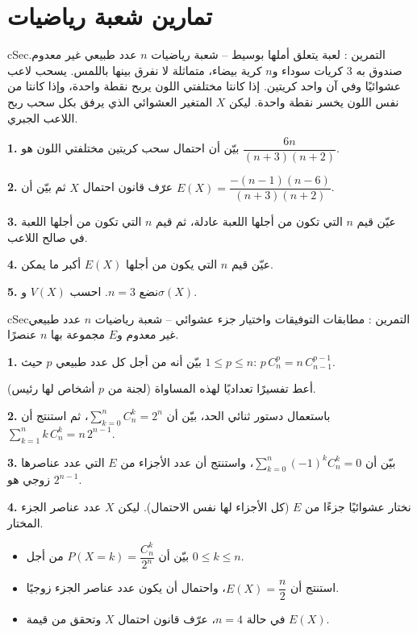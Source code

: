 \documentclass[12pt,a4paper]{article}
\newenvironment{BOX}[2]{\begin{otherlanguage}{english}\begin{arbox}{#1}{#2}}{\end{arbox}\end{otherlanguage}}
\newcounter{exo}
\newenvironment{tamrin}[1]{\stepcounter{exo}\begin{BOX}{cSec}{التمرين \theexo: #1}}{\end{BOX}}
\newenvironment{sq}{\begin{itemize}[leftmargin=2.4em,itemsep=3pt]}{\end{itemize}}
\newcommand{\qa}{\item[(أ)]}\newcommand{\qb}{\item[(ب)]}\newcommand{\qc}{\item[(جـ)]}\newcommand{\qd}{\item[(د)]}\newcommand{\qe}{\item[(هـ)]}
\newcommand{\QQ}[1]{\par\smallskip\textbf{#1.} }
\begin{document}
\section{تمارين شعبة رياضيات}

\begin{tamrin}{لعبة يتعلق أملها بوسيط -- شعبة رياضيات}
$n$ عدد طبيعي غير معدوم. صندوق به 3 كريات سوداء و$n$ كرية بيضاء، متماثلة لا نفرق بينها باللمس. يسحب لاعب عشوائيًا وفي آن واحد كريتين. إذا كانتا مختلفتي اللون يربح نقطة واحدة، وإذا كانتا من نفس اللون يخسر نقطة واحدة. ليكن $X$ المتغير العشوائي الذي يرفق بكل سحب ربح اللاعب الجبري.
\QQ{1} بيّن أن احتمال سحب كريتين مختلفتي اللون هو $\dfrac{6n}{(n+3)(n+2)}$.
\QQ{2} عرّف قانون احتمال $X$ ثم بيّن أن $E(X)=\dfrac{-(n-1)(n-6)}{(n+3)(n+2)}$.
\QQ{3} عيّن قيم $n$ التي تكون من أجلها اللعبة عادلة، ثم قيم $n$ التي تكون من أجلها اللعبة في صالح اللاعب.
\QQ{4} عيّن قيم $n$ التي يكون من أجلها $E(X)$ أكبر ما يمكن.
\QQ{5} نضع $n=3$. احسب $V(X)$ و$\sigma(X)$.
\end{tamrin}

\begin{tamrin}{مطابقات التوفيقات واختيار جزء عشوائي -- شعبة رياضيات}
$n$ عدد طبيعي غير معدوم و$E$ مجموعة بها $n$ عنصرًا.
\QQ{1} بيّن أنه من أجل كل عدد طبيعي $p$ حيث $1\leqslant p\leqslant n$: \quad $p\,C_n^p=n\,C_{n-1}^{p-1}$.\par
أعط تفسيرًا تعداديًا لهذه المساواة (لجنة من $p$ أشخاص لها رئيس).
\QQ{2} باستعمال دستور ثنائي الحد، بيّن أن $\displaystyle\sum_{k=0}^{n}C_n^k=2^n$، ثم استنتج أن $\displaystyle\sum_{k=1}^{n}k\,C_n^k=n\,2^{n-1}$.
\QQ{3} بيّن أن $\displaystyle\sum_{k=0}^{n}(-1)^kC_n^k=0$، واستنتج أن عدد الأجزاء من $E$ التي عدد عناصرها زوجي هو $2^{n-1}$.
\QQ{4} نختار عشوائيًا جزءًا من $E$ (كل الأجزاء لها نفس الاحتمال). ليكن $X$ عدد عناصر الجزء المختار.
\begin{sq}
\qa بيّن أن $P(X=k)=\dfrac{C_n^k}{2^n}$ من أجل $0\leqslant k\leqslant n$.
\qb استنتج أن $E(X)=\dfrac n2$، واحتمال أن يكون عدد عناصر الجزء زوجيًا.
\qc في حالة $n=4$، عرّف قانون احتمال $X$ وتحقق من قيمة $E(X)$.
\end{sq}
\end{tamrin}
\end{document}
